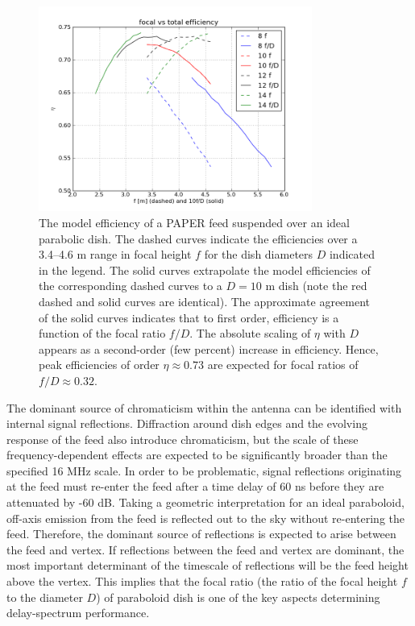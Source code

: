 \documentclass[11pt]{article}
\begin{document}
\begin{figure}[h]
\centering
\includegraphics[width=0.8\textwidth]{heraDishfDplot.png}
\caption{The model efficiency of a PAPER feed suspended over an ideal parabolic dish.  
The dashed curves indicate the efficiencies over a 3.4--4.6 m range in focal height $f$
for the dish diameters $D$ indicated in the legend.  The solid curves extrapolate the
model efficiencies of the corresponding dashed curves to a $D=10$ m dish (note
the red dashed and solid curves are identical). The approximate agreement of the
solid curves indicates that to first order, efficiency is a function
of the focal ratio $f/D$. The absolute scaling of $\eta$ with $D$ appears as a second-order (few percent)
increase in efficiency.  Hence, peak efficiencies of order $\eta\approx0.73$ are expected for
focal ratios of $f/D\approx0.32$.}
\label{fig:efficiency}
\end{figure}


The dominant source of chromaticism within the
antenna can be identified with internal signal reflections.  Diffraction around dish
edges and the evolving response of the feed also introduce chromaticism, but the
scale of these frequency-dependent effects are expected to be significantly broader
than the specified 16 MHz scale.  
In order to be problematic, signal reflections originating at the feed must re-enter
the feed after a time delay of 60 ns before they are attenuated by -60 dB.
Taking a geometric interpretation for an ideal paraboloid, 
off-axis emission from the feed is
reflected out to the sky without re-entering the feed.
Therefore, the dominant source of reflections is expected to arise between the feed and vertex.
If reflections between the feed and vertex are dominant, the most important determinant
of the timescale of reflections will be the feed height above the vertex.  This 
implies that the focal ratio (the ratio of the focal height $f$ to the diameter $D$)
of paraboloid dish is one of the key aspects 
determining delay-spectrum performance.
\end{document}
